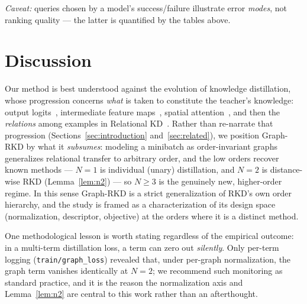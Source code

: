 \documentclass[11pt,letterpaper]{article}
\begin{document}
\emph{Caveat:} queries chosen by a model's success/failure illustrate error \emph{modes},
not ranking quality --- the latter is quantified by the tables above.

\section{Discussion}
\label{sec:discussion}

Our method is best understood against the evolution of knowledge distillation, whose
progression concerns \emph{what} is taken to constitute the teacher's knowledge:
output logits~\cite{hinton2015distilling}, intermediate feature
maps~\cite{romero2015fitnets}, spatial attention~\cite{zagoruyko2017attention}, and
then the \emph{relations} among examples in Relational KD~\cite{park2019relational}.
Rather than re-narrate that progression (Sections~\ref{sec:introduction}
and~\ref{sec:related}), we position Graph-RKD by what it \emph{subsumes}: modeling a
minibatch as order-invariant graphs generalizes relational transfer to arbitrary
order, and the low orders recover known methods --- $N = 1$ is individual (unary)
distillation, and $N = 2$ is distance-wise RKD (Lemma~\ref{lem:n2}) --- so
$N \geq 3$ is the genuinely new, higher-order regime. In this sense Graph-RKD is a
strict generalization of RKD's own order hierarchy, and the study is framed as a
characterization of its design space (normalization, descriptor, objective) at the
orders where it is a distinct method.

One methodological lesson is worth stating regardless of the empirical outcome: in a
multi-term distillation loss, a term can zero out \emph{silently}. Only per-term
logging (\texttt{train/graph\_loss}) revealed that, under per-graph normalization, the
graph term vanishes identically at $N = 2$; we recommend such monitoring as standard
practice, and it is the reason the normalization axis and Lemma~\ref{lem:n2} are
central to this work rather than an afterthought.

%
\end{document}
